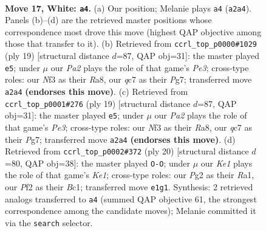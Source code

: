 \documentclass[11pt]{article}
\begin{document}
\clearpage

\begin{figure}[p]\centering
\begin{subfigure}{0.46\textwidth}\centering
\resizebox{\linewidth}{!}{%
\newchessgame
\chessboard[
  setfen={r1bk3r/ppq3pp/2pb4/3p1p2/3P4/1Q2PN2/PP3PPP/1RB1K2R w K - 4 17},
  showmover=false,
  pgfstyle=straightmove, color=movearrow, markmove={a2-a4}
]}
\caption{}
\end{subfigure}\hfill
\begin{subfigure}{0.46\textwidth}\centering
\resizebox{\linewidth}{!}{%
\newchessgame
\chessboard[
  setfen={r1b1k2r/1pq2ppp/p1pbpn2/8/P3P3/3B4/1PP1QPPP/RNB2R1K b kq - 0 10},
  showmover=false,
  pgfstyle=straightmove, color=movearrow, markmove={e6-e5}
]}
\caption{}
\end{subfigure}
\\[4pt]
\begin{subfigure}{0.46\textwidth}\centering
\resizebox{\linewidth}{!}{%
\newchessgame
\chessboard[
  setfen={r1b1k2r/1pq2ppp/p1pbpn2/8/P3P3/3B4/1PP1QPPP/RNB2R1K b kq - 0 10},
  showmover=false,
  pgfstyle=straightmove, color=movearrow, markmove={e6-e5}
]}
\caption{}
\end{subfigure}\hfill
\begin{subfigure}{0.46\textwidth}\centering
\resizebox{\linewidth}{!}{%
\newchessgame
\chessboard[
  setfen={rn3k1r/ppqb1ppp/2pb1p2/8/3N4/3P2P1/PPP1QPBP/R1B1K2R w KQ - 7 11},
  showmover=false,
  pgfstyle=straightmove, color=movearrow, markmove={e1-g1}
]}
\caption{}
\end{subfigure}
\caption{\textbf{Move 17, White: \texttt{a4}.} (a) Our position; Melanie plays \texttt{a4} (\texttt{a2a4}). Panels (b)--(d) are the retrieved master positions whose correspondence most drove this move (highest QAP objective among those that transfer to it). (b) Retrieved from \texttt{ccrl\_top\_p0000\#1029} (ply 19) [structural distance $d$=87, QAP obj=31]: the master played \texttt{e5}; under $\mu$ our \emph{Pa2} plays the role of that game's \emph{Pe3}; cross-type roles: our \emph{N}f3 as their \emph{R}a8, our \emph{q}c7 as their \emph{P}g7; transferred move \texttt{a2a4} \textbf{(endorses this move)}. (c) Retrieved from \texttt{ccrl\_top\_p0001\#276} (ply 19) [structural distance $d$=87, QAP obj=31]: the master played \texttt{e5}; under $\mu$ our \emph{Pa2} plays the role of that game's \emph{Pe3}; cross-type roles: our \emph{N}f3 as their \emph{R}a8, our \emph{q}c7 as their \emph{P}g7; transferred move \texttt{a2a4} \textbf{(endorses this move)}. (d) Retrieved from \texttt{ccrl\_top\_p0002\#372} (ply 20) [structural distance $d$=80, QAP obj=38]: the master played \texttt{O-O}; under $\mu$ our \emph{Ke1} plays the role of that game's \emph{Ke1}; cross-type roles: our \emph{P}g2 as their \emph{R}a1, our \emph{P}f2 as their \emph{B}c1; transferred move \texttt{e1g1}. Synthesis: 2 retrieved analogs transferred to \texttt{a4} (summed QAP objective 61, the strongest correspondence among the candidate moves); Melanie committed it via the \texttt{search} selector.}
\label{fig:thought-m32}
\end{figure}
\end{document}
